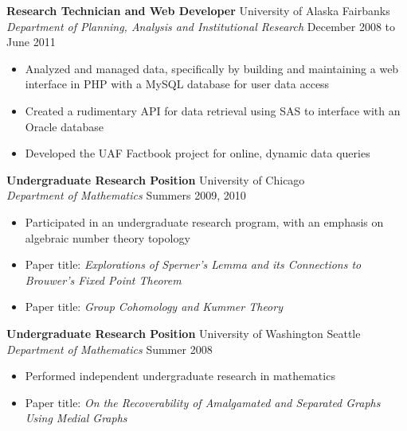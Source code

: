 \documentclass{article}
\begin{document}
\begin{flushleft}
\hspace{20pt}
\textbf{Research Technician and Web Developer} \hfill University of Alaska Fairbanks\\
\hspace{20pt}
\textit{Department of Planning, Analysis and Institutional Research} \hfill December 2008 to June 2011\\
\begin{itemize}[leftmargin=50pt,itemsep=-1pt]
\item Analyzed and managed data, specifically by building and maintaining a web interface in PHP with a MySQL database for user data access
\item Created a rudimentary API for data retrieval using SAS to interface with an Oracle database
\item Developed the UAF Factbook project for online, dynamic data queries
\end{itemize}
 
\hspace{20pt}
\textbf{Undergraduate Research Position} \hfill University of Chicago\\
\hspace{20pt}
\textit{Department of Mathematics} \hfill Summers 2009, 2010\\
\begin{itemize}[leftmargin=50pt,itemsep=-1pt]
\item Participated in an undergraduate research program, with an emphasis on algebraic number theory topology
\item Paper title: \textit{Explorations of Sperner's Lemma and its Connections to Brouwer's Fixed Point Theorem}
\item Paper title: \textit{Group Cohomology and Kummer Theory}
\end{itemize}

\hspace{20pt}
\textbf{Undergraduate Research Position} \hfill University of Washington Seattle\\
\hspace{20pt}
\textit{Department of Mathematics} \hfill Summer 2008\\
\begin{itemize}[leftmargin=50pt,itemsep=-1pt]
\item Performed independent undergraduate research in mathematics
\item Paper title: \textit{On the Recoverability of Amalgamated and Separated Graphs Using Medial Graphs}
\end{itemize}


\end{flushleft}
\end{document}
